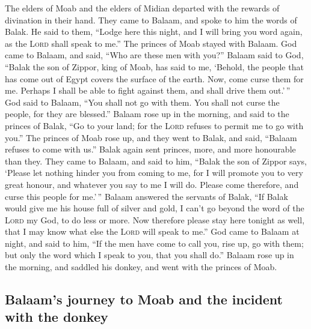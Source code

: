  The elders of Moab and the elders of Midian departed with
the rewards of divination in their hand. They came to Balaam, and spoke
to him the words of Balak.  He said to them, ``Lodge here
this night, and I will bring you word again, as the \textsc{Lord} shall
speak to me.'' The princes of Moab stayed with Balaam. 
God came to Balaam, and said, ``Who are these men with you?''
 Balaam said to God, ``Balak the son of Zippor, king of
Moab, has said to me,  `Behold, the people that has come
out of Egypt covers the surface of the earth. Now, come curse them for
me. Perhaps I shall be able to fight against them, and shall drive them
out.'\,''  God said to Balaam, ``You shall not go with
them. You shall not curse the people, for they are blessed.''
 Balaam rose up in the morning, and said to the princes
of Balak, ``Go to your land; for the \textsc{Lord} refuses to permit me
to go with you.''  The princes of Moab rose up, and they
went to Balak, and said, ``Balaam refuses to come with us.''
 Balak again sent princes, more, and more honourable than
they.  They came to Balaam, and said to him, ``Balak the
son of Zippor says, `Please let nothing hinder you from coming to me,
 for I will promote you to very great honour, and
whatever you say to me I will do. Please come therefore, and curse this
people for me.'\,''  Balaam answered the servants of
Balak, ``If Balak would give me his house full of silver and gold, I
can't go beyond the word of the \textsc{Lord} my God, to do less or
more.  Now therefore please stay here tonight as well,
that I may know what else the \textsc{Lord} will speak to me.''
 God came to Balaam at night, and said to him, ``If the
men have come to call you, rise up, go with them; but only the word
which I speak to you, that you shall do.''  Balaam rose
up in the morning, and saddled his donkey, and went with the princes of
Moab.

\hypertarget{balaams-journey-to-moab-and-the-incident-with-the-donkey}{%
\subsection{Balaam's journey to Moab and the incident with the
donkey}\label{balaams-journey-to-moab-and-the-incident-with-the-donkey}}

